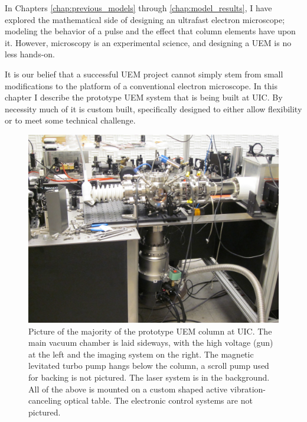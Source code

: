 
In Chapters \ref{chap:previous_models} through \ref{chap:model_results}, I have explored the mathematical side of designing an ultrafast electron microscope; modeling the behavior of a pulse and the effect that column elements have upon it.
However, microscopy is an experimental science, and designing a UEM is no less hands-on.

It is our belief that a successful UEM project cannot simply stem from small modifications to the platform of a conventional electron microscope.
In this chapter I describe the prototype UEM system that is being built at UIC.
By necessity much of it is custom built, specifically designed to either allow flexibility or to meet some technical challenge.

\begin{figure}
  \centering
  \includegraphics{inc/hardware/column.jpg}
  \caption[Picture of the prototype UEM column at UIC]{
    Picture of the majority of the prototype UEM column at UIC.
    The main vacuum chamber is laid sideways, with the high voltage (gun) at the left and the imaging system on the right.
    The magnetic levitated turbo pump hangs below the column, a scroll pump used for backing is not pictured.
    The laser system is in the background.
    All of the above is mounted on a custom shaped active vibration-canceling optical table.
    The electronic control systems are not pictured.
  }
  \label{fig:column-pic}
\end{figure}


